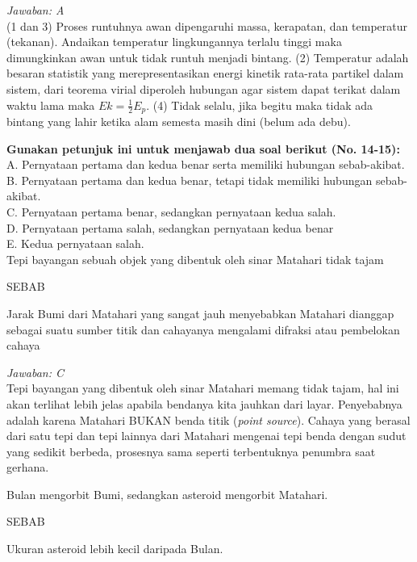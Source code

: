\documentclass[11pt,fleqn, a4paper]{exam}
\begin{document}
\begin{questions}
\textit{Jawaban: A}\\
(1 dan 3) Proses runtuhnya awan dipengaruhi massa, kerapatan, dan temperatur (tekanan). Andaikan temperatur lingkungannya terlalu tinggi maka dimungkinkan awan untuk tidak runtuh menjadi bintang. (2) Temperatur adalah besaran statistik yang merepresentasikan energi kinetik rata-rata partikel dalam sistem, dari teorema virial diperoleh hubungan agar sistem dapat terikat dalam waktu lama maka $Ek = \frac{1}{2} E_p$. (4) Tidak selalu, jika begitu maka tidak ada bintang yang lahir ketika alam semesta masih dini (belum ada debu).


\vspace{1cm}
\textbf{Gunakan petunjuk ini untuk menjawab dua soal berikut (No. 14-15):}\\
A. Pernyataan pertama dan kedua benar serta memiliki hubungan sebab-akibat.\\
B. Pernyataan pertama dan kedua benar, tetapi tidak memiliki hubungan sebab-akibat.\\
C. Pernyataan pertama benar, sedangkan pernyataan kedua salah.\\
D. Pernyataan pertama salah, sedangkan pernyataan kedua benar\\
E. Kedua pernyataan salah.\\

\vspace{0.5cm}
\question Tepi bayangan sebuah objek yang dibentuk oleh sinar Matahari tidak tajam
\begin{center}
SEBAB
\end{center}
\noindent Jarak Bumi dari Matahari yang sangat jauh menyebabkan Matahari dianggap sebagai suatu sumber titik dan cahayanya mengalami difraksi atau pembelokan cahaya  

\textit{Jawaban: C}\\
Tepi bayangan yang dibentuk oleh sinar Matahari memang tidak tajam, hal ini akan terlihat lebih jelas apabila bendanya kita jauhkan dari layar. Penyebabnya adalah karena Matahari BUKAN benda titik (\textit{point source}). Cahaya yang berasal dari satu tepi dan tepi lainnya dari Matahari mengenai tepi benda dengan sudut yang sedikit berbeda, prosesnya sama seperti terbentuknya penumbra saat gerhana. 


\vspace{0.5cm}
\question Bulan mengorbit Bumi, sedangkan asteroid mengorbit Matahari.
\begin{center}
SEBAB
\end{center}
\noindent Ukuran asteroid lebih kecil daripada Bulan.


\end{questions}
\end{document}

